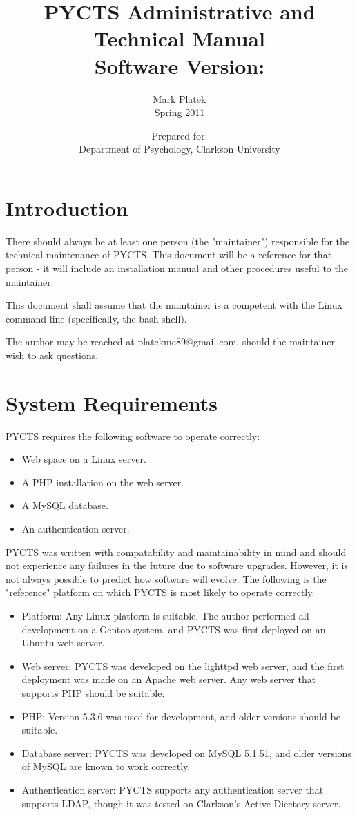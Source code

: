 \documentclass[letterpaper,titlepage]{article}
\title{ {\Huge {\bf PYCTS Administrative and Technical Manual} } \\ {\Large Software Version: \softwareversion } }
\author{Mark Platek \\ Spring 2011}
\date{Prepared for: \\ Department of Psychology, Clarkson University}
\begin{document}
\maketitle

\tableofcontents
\newpage

\section{Introduction}
There should always be at least one person (the "maintainer") responsible for the technical maintenance of PYCTS. This document will be a reference for that person - it will include an installation manual and other procedures useful to the maintainer.

This document shall assume that the maintainer is a competent with the Linux command line (specifically, the bash shell).

The author may be reached at platekme89@gmail.com, should the maintainer wish to ask questions.

\section{System Requirements}
PYCTS requires the following software to operate correctly:

\begin{itemize}
\item Web space on a Linux server.
\item A PHP installation on the web server.
\item A MySQL database.
\item An authentication server.
\end{itemize}

PYCTS was written with compatability and maintainability in mind and should not experience any failures in the future due to software upgrades. However, it is not always possible to predict how software will evolve. The following is the "reference" platform on which PYCTS is most likely to operate correctly.

\begin{itemize}
\item Platform: Any Linux platform is suitable. The author performed all development on a Gentoo system, and PYCTS was first deployed on an Ubuntu web server.
\item Web server: PYCTS was developed on the lighttpd web server, and the first deployment was made on an Apache web server. Any web server that supports PHP should be suitable.
\item PHP: Version 5.3.6 was used for development, and older versions should be suitable.
\item Database server: PYCTS was developed on MySQL 5.1.51, and older versions of MySQL are known to work correctly.
\item Authentication server: PYCTS supports any authentication server that supports LDAP, though it was tested on Clarkson's Active Diectory server.
\end{itemize}
\end{document}
